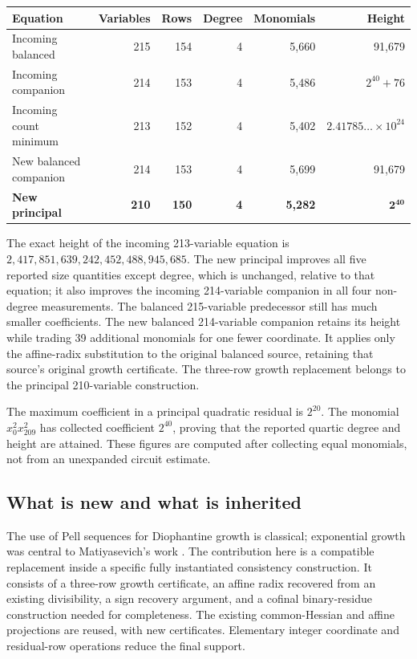 \documentclass[11pt,a4paper]{article}
\theoremstyle{remark}\newtheorem{remark}[theorem]{Remark}
\begin{document}
\begin{center}\small
\begin{tabular}{lrrrrr}
\toprule
Equation & Variables & Rows & Degree & Monomials & Height\\
\midrule
Incoming balanced & 215 & 154 & 4 & 5,660 & 91,679\\
Incoming companion & 214 & 153 & 4 & 5,486 & $2^{40}+76$\\
Incoming count minimum & 213 & 152 & 4 & 5,402 & $2.41785\ldots\times10^{24}$\\
New balanced companion & 214 & 153 & 4 & 5,699 & 91,679\\
\textbf{New principal} & \textbf{210} & \textbf{150} & \textbf{4} & \textbf{5,282} & $\boldsymbol{2^{40}}$\\
\bottomrule
\end{tabular}
\end{center}

The exact height of the incoming 213-variable equation is
$2,417,851,639,242,452,488,945,685$. The new principal improves all five
reported size quantities except degree, which is unchanged, relative to that
equation; it also improves the incoming 214-variable companion in all four
non-degree measurements. The balanced 215-variable predecessor still has
much smaller coefficients. The new balanced 214-variable companion retains
its height while trading 39 additional monomials for one fewer coordinate.
It applies only the affine-radix substitution to the original balanced source,
retaining that source's original growth certificate. The three-row growth
replacement belongs to the principal 210-variable construction.

The maximum coefficient in a principal quadratic residual is $2^{20}$.
The monomial $x_0^2x_{209}^2$ has collected coefficient $2^{40}$, proving that
the reported quartic degree and height are attained. These figures are computed
after collecting equal monomials, not from an unexpanded circuit estimate.

\subsection{What is new and what is inherited}

The use of Pell sequences for Diophantine growth is classical; exponential
growth was central to Matiyasevich's work \cite{matiyasevich}. The contribution
here is a compatible replacement inside a specific fully instantiated
consistency construction. It consists of a three-row growth certificate,
an affine radix recovered from an existing divisibility, a sign recovery
argument, and a cofinal binary-residue construction needed for completeness.
The existing common-Hessian and affine projections are reused, with new
certificates. Elementary integer coordinate and residual-row operations
reduce the final support.
\end{document}
